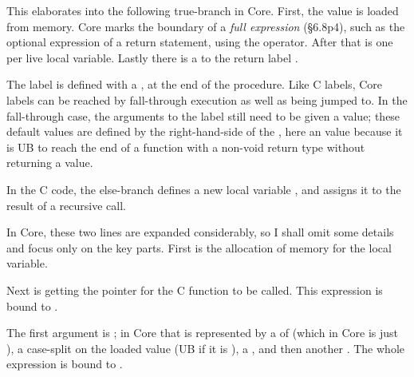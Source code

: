 
This elaborates into the following true-branch in Core. First, the value
 is loaded from memory. Core marks the boundary of a \emph{full
expression} (§6.8p4), such as the optional expression of a return statement,
using the  operator. After that is one %
 per live local variable. Lastly there is a %
 to the return label . %


The  label is defined with a , at the end
of the procedure. Like C labels, Core labels can be reached by fall-through
execution as well as being jumped to. In the fall-through case, the arguments
to the label still need to be given a value; these default values are defined
by the right-hand-side of the \coreinline{:=}, here an  %
value because it is UB to reach the end of a function with a non-void return
type without returning a value.


In the C code, the else-branch defines a new local variable ,
and assigns it to the result of a recursive call.


In Core, these two lines are expanded considerably, so I shall omit some
details and focus only on the key parts. First is the allocation of memory for
the local variable.


Next is getting the pointer for the C function to be called. This expression is
bound to .


The first argument is ; in Core that is represented by a
 of  (which in Core is just %
), a case-split on the loaded value (UB if it is
), a , and then another %
. The whole expression is bound to . %


